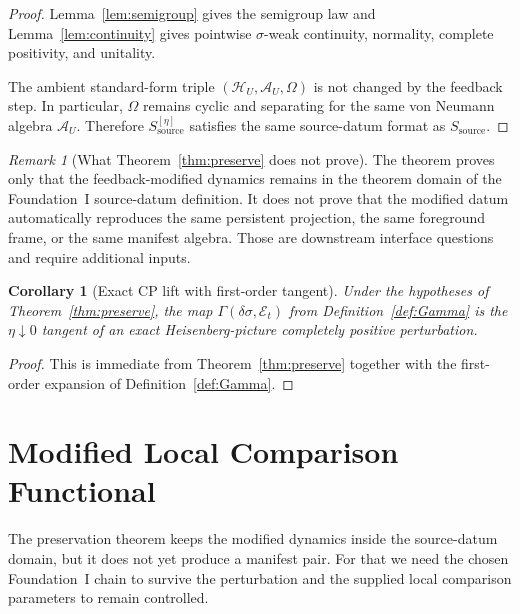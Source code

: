 \documentclass[12pt]{article}
\newtheorem{corollary}[theorem]{Corollary}
\theoremstyle{definition}
\theoremstyle{remark}
\newtheorem{remark}[theorem]{Remark}
\begin{document}
\begin{proof}
Lemma~\ref{lem:semigroup} gives the semigroup law and
Lemma~\ref{lem:continuity} gives pointwise \(\sigma\)-weak continuity,
normality, complete positivity, and unitality.

The ambient standard-form triple
\((\mathcal H_U,\mathcal A_U,\Omega)\) is not changed by the feedback
step. In particular, \(\Omega\) remains cyclic and separating for the
same von Neumann algebra \(\mathcal A_U\). Therefore
\(S_{\mathrm{source}}^{[\eta]}\) satisfies the same source-datum format
as \(S_{\mathrm{source}}\).
\end{proof}

\begin{remark}[What Theorem~\ref{thm:preserve} does not prove]
The theorem proves only that the feedback-modified dynamics remains in
the theorem domain of the Foundation~I source-datum definition. It does
not prove that the modified datum automatically reproduces the same
persistent projection, the same foreground frame, or the same manifest
algebra. Those are downstream interface questions and require additional
inputs.
\end{remark}

\begin{corollary}[Exact CP lift with first-order tangent]
\label{cor:firstorder}
Under the hypotheses of Theorem~\ref{thm:preserve}, the map
\(\Gamma(\delta\sigma,\mathcal E_t)\) from
Definition~\ref{def:Gamma} is the \(\eta\downarrow 0\) tangent of an
exact Heisenberg-picture completely positive perturbation.
\end{corollary}

\begin{proof}
This is immediate from Theorem~\ref{thm:preserve} together with the
first-order expansion of Definition~\ref{def:Gamma}.
\end{proof}

\section{Modified Local Comparison Functional}\label{sec:deficit}

The preservation theorem keeps the modified dynamics inside the
source-datum domain, but it does not yet produce a manifest pair. For
that we need the chosen Foundation~I chain to survive the perturbation
and the supplied local comparison parameters to remain controlled.
\end{document}
